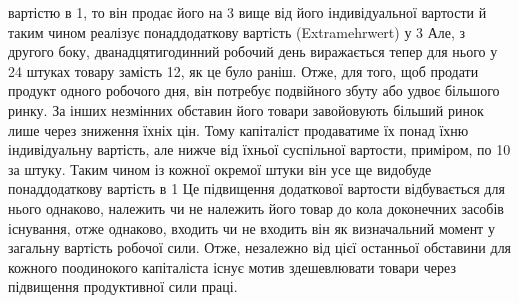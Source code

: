 \parcont{}  %
вартістю в 1, то він продає його на 3 вище від його
індивідуальної вартости й таким чином реалізує понаддодаткову
вартість (Extramehrwert) у 3 Але, з другого боку, дванадцятигодинний
робочий день виражається тепер для нього у
24 штуках товару замість 12, як це було раніш. Отже, для
того, щоб продати продукт одного робочого дня, він потребує
подвійного збуту або удвоє більшого ринку. За інших незмінних
обставин його товари завойовують більший ринок лише через
зниження їхніх цін. Тому капіталіст продаватиме їх понад їхню
індивідуальну вартість, але нижче від їхньої суспільної вартости,
приміром, по 10 за штуку. Таким чином із кожної окремої
штуки він усе ще видобуде понаддодаткову вартість в 1 Це
підвищення додаткової вартости відбувається для нього однаково,
належить чи не належить його товар до кола доконечних
засобів існування, отже однаково, входить чи не входить він як
визначальний момент у загальну вартість робочої сили. Отже,
незалежно від цієї останньої обставини для кожного поодинокого
капіталіста існує мотив здешевлювати товари через підвищення
продуктивної сили праці.

